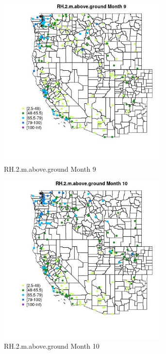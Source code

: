 \begin{figure} 
\centering  
\includegraphics[width=0.77\textwidth]{Code_Outputs/Report_ML_input_PM25_Step4_part_e_de_duplicated_aveswNAs_MapObsMo9RH2maboveground.jpg} 
\caption{\label{fig:Report_ML_input_PM25_Step4_part_e_de_duplicated_aveswNAsMapObsMo9RH2maboveground}RH.2.m.above.ground Month 9} 
\end{figure} 
 

\clearpage 

\begin{figure} 
\centering  
\includegraphics[width=0.77\textwidth]{Code_Outputs/Report_ML_input_PM25_Step4_part_e_de_duplicated_aveswNAs_MapObsMo10RH2maboveground.jpg} 
\caption{\label{fig:Report_ML_input_PM25_Step4_part_e_de_duplicated_aveswNAsMapObsMo10RH2maboveground}RH.2.m.above.ground Month 10} 
\end{figure} 
 

